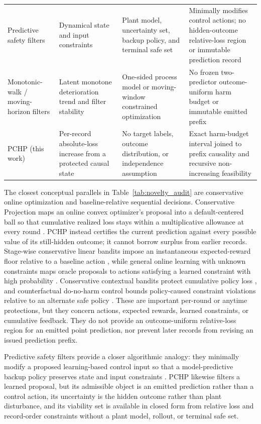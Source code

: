 \documentclass[preprint,12pt]{elsarticle}
\begin{document}
\begin{table}[H]
\begin{tabularx}{\textwidth}{@{}>{\raggedright\arraybackslash}p{}>{\raggedright\arraybackslash}p{}>{\raggedright\arraybackslash}p{}>{\raggedright\arraybackslash}X@{}}
    Predictive safety filters \citep{wabersich2021predictive} & Dynamical state and input constraints & Plant model, uncertainty set, backup policy, and terminal safe set & Minimally modifies control actions; no hidden-outcome relative-loss region or immutable prediction record \\
    Monotonic-walk / moving-horizon filters \citep{samar2004moving,gorinevsky2008efficient} & Latent monotone deterioration trend and filter stability & One-sided process model or moving-window constrained optimization & No frozen two-predictor outcome-uniform harm budget or immutable emitted prefix \\
    PCHP (this work) & Per-record absolute-loss increase from a protected causal state & No target labels, outcome distribution, or independence assumption & Exact harm-budget interval joined to prefix causality and recursive non-increasing feasibility \\
    \bottomrule
  \end{tabularx}
\end{table}

The closest conceptual parallels in Table~\ref{tab:novelty_audit} are conservative online optimization and baseline-relative sequential decisions. Conservative Projection maps an online convex optimizer's proposal into a default-centered ball so that cumulative realized loss stays within a multiplicative allowance at every round \citep{bernasconi2021conservative}. PCHP instead certifies the current prediction against every possible value of its still-hidden outcome; it cannot borrow surplus from earlier records. Stage-wise conservative linear bandits impose an instantaneous expected-reward floor relative to a baseline action \citep{moradipari2020stagewise}, while general online learning with unknown constraints maps oracle proposals to actions satisfying a learned constraint with high probability \citep{sridharan2025unknown}. Conservative contextual bandits protect cumulative policy loss \citep{deb2025conservative}, and counterfactual do-no-harm control bounds policy-caused constraint violations relative to an alternate safe policy \citep{vaskov2024donoharm}. These are important per-round or anytime protections, but they concern actions, expected rewards, learned constraints, or cumulative feedback. They do not provide an outcome-uniform relative-loss region for an emitted point prediction, nor prevent later records from revising an issued prediction prefix.

Predictive safety filters provide a closer algorithmic analogy: they minimally modify a proposed learning-based control input so that a model-predictive backup policy preserves state and input constraints \citep{wabersich2021predictive}. PCHP likewise filters a learned proposal, but its admissible object is an emitted prediction rather than a control action, its uncertainty is the hidden outcome rather than plant disturbance, and its viability set is available in closed form from relative loss and record-order constraints without a plant model, rollout, or terminal safe set.
\end{document}
